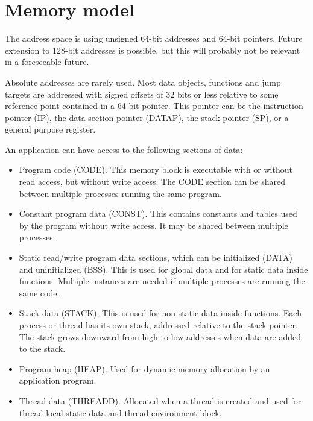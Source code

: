 \documentclass[forwardcom.tex]{subfiles}
\begin{document}
\RaggedRight

\chapter{Memory model} \label{memoryModel}
The address space is using unsigned 64-bit addresses and 64-bit pointers. Future extension to 128-bit addresses is possible, but this will probably not be relevant in a foreseeable future. 
\vspace{2mm}

Absolute addresses are rarely used. Most data objects, functions and jump targets are addressed with signed offsets of 32 bits or less relative to some reference point contained in a 64-bit pointer. This pointer can be the instruction pointer (IP), the data section pointer (DATAP), the stack pointer (SP), or a general purpose register.
\vspace{2mm}

An application can have access to the following sections of data:
\vspace{2mm}

\begin{itemize}
\item Program code (CODE). This memory block is executable with or without read access, but without write access. The CODE section can be shared between multiple processes running the same program. 

\item Constant program data (CONST). This contains constants and tables used by the program without write access. It may be shared between multiple processes. 

\item Static read/write program data sections, which can be initialized (DATA) and uninitialized (BSS). This is used for global data and for static data inside functions. Multiple instances are needed if multiple processes are running the same code. 

\item Stack data (STACK). This is used for non-static data inside functions. Each process or thread has its own stack, addressed relative to the stack pointer. The stack grows downward from high to low addresses when data are added to the stack. 

\item Program heap (HEAP). Used for dynamic memory allocation by an application program. 

\item Thread data (THREADD). Allocated when a thread is created and used for thread-local static data and thread environment block.
\end{itemize}
\end{document}
